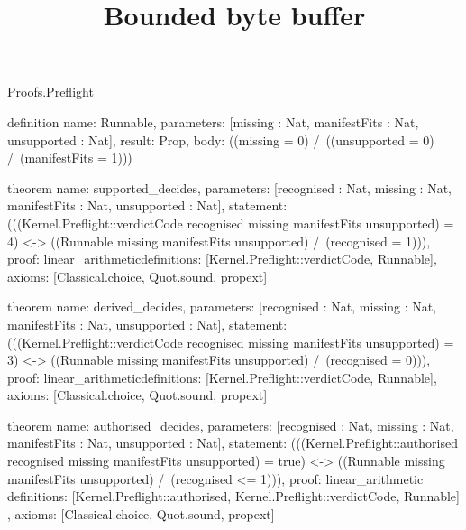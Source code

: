 \begin{lexlean}{Proofs.Preflight}
\title{Bounded byte buffer}
\begin{semanticmodule}
definition{
  name: Runnable,
  parameters: [missing : Nat, manifestFits : Nat, unsupported : Nat],
  result: Prop,
  body: ((missing = 0) /\ ((unsupported = 0) /\ (manifestFits = 1)))
}

theorem{
  name: supported_decides,
  parameters: [recognised : Nat, missing : Nat, manifestFits : Nat, unsupported : Nat],
  statement: (((Kernel.Preflight::verdictCode recognised missing manifestFits unsupported) = 4) <-> ((Runnable missing manifestFits unsupported) /\ (recognised = 1))),
  proof: linear_arithmetic{definitions: [Kernel.Preflight::verdictCode, Runnable]},
  axioms: [Classical.choice, Quot.sound, propext]
}

theorem{
  name: derived_decides,
  parameters: [recognised : Nat, missing : Nat, manifestFits : Nat, unsupported : Nat],
  statement: (((Kernel.Preflight::verdictCode recognised missing manifestFits unsupported) = 3) <-> ((Runnable missing manifestFits unsupported) /\ (recognised = 0))),
  proof: linear_arithmetic{definitions: [Kernel.Preflight::verdictCode, Runnable]},
  axioms: [Classical.choice, Quot.sound, propext]
}

theorem{
  name: authorised_decides,
  parameters: [recognised : Nat, missing : Nat, manifestFits : Nat, unsupported : Nat],
  statement: (((Kernel.Preflight::authorised recognised missing manifestFits unsupported) = true) <-> ((Runnable missing manifestFits unsupported) /\ (recognised <= 1))),
  proof: linear_arithmetic{
    definitions: [Kernel.Preflight::authorised, Kernel.Preflight::verdictCode, Runnable]
  },
  axioms: [Classical.choice, Quot.sound, propext]
}
\end{semanticmodule}
\end{lexlean}
